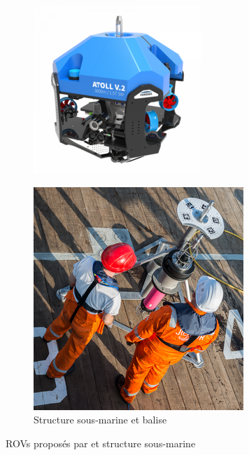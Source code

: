 \begin{figure}[!htb]
\begin{subfigure}[t]{0.3\textwidth}
					\includegraphics[width=\textwidth]{imgs/atoll.png}
					\caption{\atoll{}}
					\label{fig:atoll}
				\end{subfigure}
				\hfill
				\begin{subfigure}[t]{0.3\textwidth}
					\centering
					\includegraphics[width=\textwidth]{imgs/frame.png}
					\caption{Structure sous-marine et balise}
					\label{fig:frame_lbl}
				\end{subfigure}
				\caption{\gls{ROV}s proposés par \forssea{} et structure sous-marine}
				\label{fig:ROVs}
			\end{figure}

